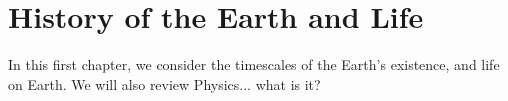 
\chapter{History of the Earth and Life}

In this first chapter, we consider the timescales of the Earth's existence, and life on Earth.  We will also review Physics... what is it?
